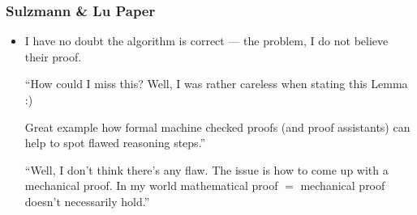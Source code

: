 \documentclass[dvipsnames,14pt,t]{beamer}
\begin{document}
\begin{frame}[t,squeeze]
\frametitle{Sulzmann \& Lu Paper}

\begin{itemize}
\item I have no doubt the algorithm is correct --- 
  the problem, I do not believe their proof.

  \begin{center}
  \begin{bubble}[10cm]\small
  ``How could I miss this? Well, I was rather careless when 
  stating this Lemma :)\smallskip
 
  Great example how formal machine checked proofs (and 
  proof assistants) can help to spot flawed reasoning steps.''
  \end{bubble}
  \end{center}\pause
  
  \begin{center}
  \begin{bubble}[10cm]\small
  ``Well, I don't think there's any flaw. The issue is how to 
  come up with a mechanical proof. In my world mathematical 
  proof $=$ mechanical proof doesn't necessarily hold.''
  \end{bubble}
  \end{center}\pause
  
\end{itemize}

  

\end{frame}
\end{document}
